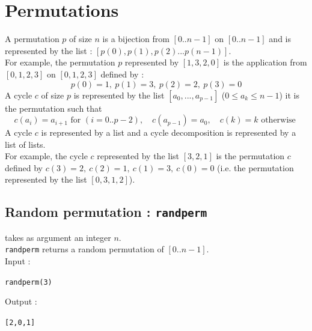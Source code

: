 \documentclass[a4paper,11pt]{book}
\begin{document}
\section{Permutations}
A permutation $p$ of size $n$ is a bijection from $[0..n-1]$ on 
$[0..n-1]$ and is represented by the list :
 $[p(0),p(1),p(2)...p(n-1)]$.\\
For example, the permutation $p$ represented by $[1,3,2,0]$ is 
the application from $[0,1,2,3]$ on $[0,1,2,3]$ defined by :
\[ p(0)=1,\ p(1)=3,\ p(2)=2,\  p(3)=0 \]
A cycle $c$ of size $p$  is represented by the list
$[a_0,...,a_{p-1}]$ ($0\leq a_k\leq n-1$) it is the permutation such that 
\[ c(a_i)=a_{i+1} \mbox{ for }(i=0..p-2), \quad
c(a_{p-1})=a_0, \quad 
 c(k)=k \mbox{ otherwise }\]
A cycle $c$ is  represented by a list and a cycle decomposition
is  represented by a list of lists.\\
For example, the cycle $c$  represented by the list $[3,2,1]$ is the 
permutation $c$ defined by $c(3)=2,\ c(2)=1,\ c(1)=3,\ c(0)=0$ (i.e. the
permutation represented by the list $[0,3,1,2]$).
 
\subsection{Random permutation : {\tt randperm}}
 takes as argument an integer $n$.\\
{\tt randperm} returns a random permutation of $[0..n-1]$.\\
Input :
\begin{center}{\tt randperm(3)}\end{center}
Output :
\begin{center}{\tt [2,0,1]}\end{center}
\end{document}
